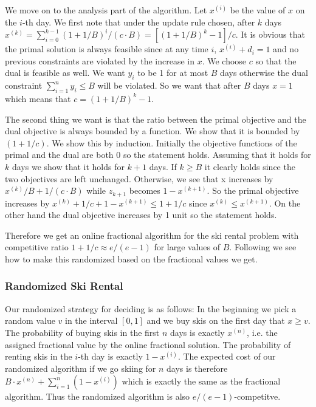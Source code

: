 We move on to the analysis part of the algorithm. Let $x^{(i)}$ be the value of $x$ on the $i$-th day. We first note that under the update rule chosen, after $k$ days $x^{(k)} =  \sum_{i=0}^{k-1} (1+1/B)^i / (c\cdot B) = [(1+1/B)^k-1]/c$. It is obvious that the primal solution is always feasible since at any time $i$, $x^{(i)}+d_i=1$ and no previous constraints are violated by the increase in $x$. We choose $c$ so that the dual is feasible as well. We want $y_i$ to be 1 for at most $B$ days otherwise the dual constraint  $\sum^n_{i=1} y_i \le B$ will be violated. So we want that after $B$ days $x = 1$ which means that $c = (1+1/B)^k-1$.

The second thing we want is that the ratio between the primal objective and the dual objective is always bounded by a function. 
We show that it is bounded by $(1+1/c)$. We show this by induction. Initially the objective functions of the primal and the dual are both 0 so the statement holds. Assuming that it holds for $k$ days we show that it holds for $k+1$ days. If $k\ge B$ it clearly holds since the two objectives are left unchanged. Otherwise, we see that x increases by $x^{(k)} / B + 1/(c \cdot B)$ while $z_{k+1}$ becomes $1 - x^{(k+1)}$. So the primal objective increases by $x^{(k)} + 1/c + 1 - x^{(k+1)} \le 1 + 1/c$ since $x^{(k)} \le x^{(k+1)}$. On the other hand the dual objective increases by 1 unit so the statement holds.

Therefore we get an online fractional algorithm for the ski rental problem with competitive ratio $1+1/c \approx e/(e-1)$ for large values of $B$.
Following we see how to make this randomized based on the fractional values we get.

\subsubsection{Randomized Ski Rental}
Our randomized strategy for deciding is as follows: In the beginning we pick a random value $v$ in the interval $[0,1]$ and we buy skis on the first day that $x \ge v$. The probability of buying skis in the first $n$ days is exactly $x^{(n)}$, i.e. the assigned fractional value by the online fractional solution. The probability of renting skis in the $i$-th day is exactly $1-x^{(i)}$. The expected cost of our randomized algorithm if we go skiing for $n$ days is therefore $B \cdot  x^{(n)} + \sum_{i=1}^n(1-x^{(i)})$ which is exactly the same as the fractional algorithm. Thus the randomized algorithm is also $e/(e-1)$-competitve.
